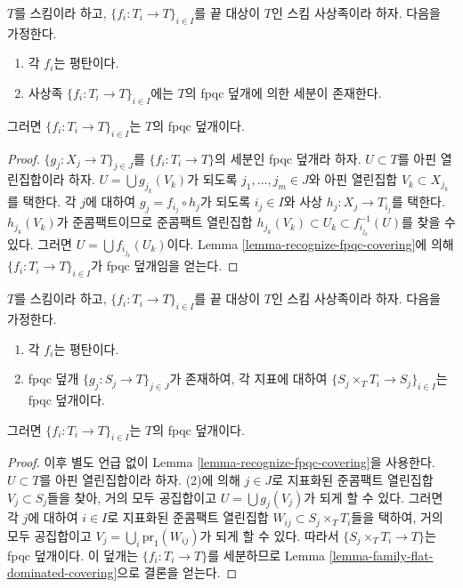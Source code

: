 \begin{lemma}
\label{lemma-family-flat-dominated-covering}
$T$를 스킴이라 하고, $\{f_i : T_i \to T\}_{i \in I}$를 끝 대상이
$T$인 스킴 사상족이라 하자. 다음을 가정한다.
\begin{enumerate}
\item 각 $f_i$는 평탄이다.
\item 사상족 $\{f_i : T_i \to T\}_{i \in I}$에는 $T$의 fpqc 덮개에
의한 세분이 존재한다.
\end{enumerate}
그러면 $\{f_i : T_i \to T\}_{i \in I}$는 $T$의 fpqc 덮개이다.
\end{lemma}

\begin{proof}
$\{g_j : X_j \to T\}_{j \in J}$를 $\{f_i : T_i \to T\}$의 세분인 fpqc
덮개라 하자. $U \subset T$를 아핀 열린집합이라 하자.
$U = \bigcup g_{j_k}(V_k)$가 되도록 $j_1, \ldots, j_m \in J$와 아핀
열린집합 $V_k \subset X_{j_k}$를 택한다. 각 $j$에 대하여
$g_j = f_{i_j} \circ h_j$가 되도록 $i_j \in I$와 사상
$h_j : X_j \to T_{i_j}$를 택한다. $h_{j_k}(V_k)$가 준콤팩트이므로
준콤팩트 열린집합
$h_{j_k}(V_k) \subset U_k \subset f_{i_{j_k}}^{-1}(U)$를 찾을 수 있다.
그러면 $U = \bigcup f_{i_{j_k}}(U_k)$이다. Lemma
\ref{lemma-recognize-fpqc-covering}에 의해
$\{f_i : T_i \to T\}_{i \in I}$가 fpqc 덮개임을 얻는다.
\end{proof}

\begin{lemma}
\label{lemma-family-flat-fpqc-local-covering}
$T$를 스킴이라 하고, $\{f_i : T_i \to T\}_{i \in I}$를 끝 대상이
$T$인 스킴 사상족이라 하자. 다음을 가정한다.
\begin{enumerate}
\item 각 $f_i$는 평탄이다.
\item fpqc 덮개 $\{g_j : S_j \to T\}_{j \in J}$가 존재하여, 각 지표에
대하여 $\{S_j \times_T T_i \to S_j\}_{i \in I}$는 fpqc 덮개이다.
\end{enumerate}
그러면 $\{f_i : T_i \to T\}_{i \in I}$는 $T$의 fpqc 덮개이다.
\end{lemma}

\begin{proof}
이후 별도 언급 없이 Lemma \ref{lemma-recognize-fpqc-covering}을 사용한다.
$U \subset T$를 아핀 열린집합이라 하자. (2)에 의해 $j \in J$로 지표화된
준콤팩트 열린집합 $V_j \subset S_j$들을 찾아, 거의 모두 공집합이고
$U = \bigcup g_j(V_j)$가 되게 할 수 있다. 그러면 각 $j$에 대하여
$i \in I$로 지표화된 준콤팩트 열린집합
$W_{ij} \subset S_j \times_T T_i$들을 택하여, 거의 모두 공집합이고
$V_j = \bigcup_i \text{pr}_1(W_{ij})$가 되게 할 수 있다. 따라서
$\{S_j \times_T T_i \to T\}$는 fpqc 덮개이다. 이 덮개는
$\{f_i : T_i \to T\}$를 세분하므로 Lemma
\ref{lemma-family-flat-dominated-covering}으로 결론을 얻는다.
\end{proof}


